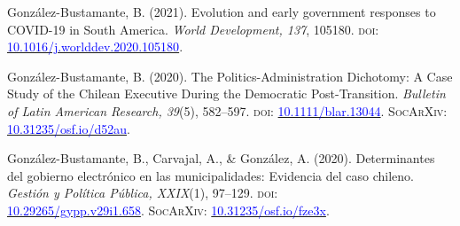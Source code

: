\begin{publications}
\begin{benumerate}{9}
\item{González-Bustamante, B. (2021). Evolution and early government responses to COVID-19 in South America. {\itshape World Development, 137}, 105180. {\scshape doi:} \href{https://doi.org/10.1016/j.worlddev.2020.105180}{\textcolor{blue}{10.1016/j.worlddev.2020.105180}}.}\vspace{1mm}

\item{González-Bustamante, B. (2020). The Politics-Administration Dichotomy: A Case Study of the Chilean Executive During the Democratic Post-Transition. {\itshape Bulletin of Latin American Research, 39}(5), 582--597. {\scshape doi}: \href{https://doi.org/10.1111/blar.13044}{\textcolor{blue}{10.1111/blar.13044}}. {\scshape \footnotesize SocArXiv:} \href{https://doi.org/10.31235/osf.io/d52au}{\textcolor{blue}{10.31235/osf.io/d52au}}.}\vspace{1mm}


\item{González-Bustamante, B., Carvajal, A., \& González, A. (2020). Determinantes del gobierno electrónico en las municipalidades: Evidencia del caso chileno. {\itshape Gestión y Política Pública, XXIX}(1), 97--129. {\scshape doi:} \\ \href{http://dx.doi.org/10.29265/gypp.v29i1.658}{\textcolor{blue}{10.29265/gypp.v29i1.658}}. {\scshape \footnotesize SocArXiv:} \href{https://doi.org/10.31235/osf.io/fze3x}{\textcolor{blue}{10.31235/osf.io/fze3x}}.} \vspace{1mm}



\end{benumerate}
\end{publications}
